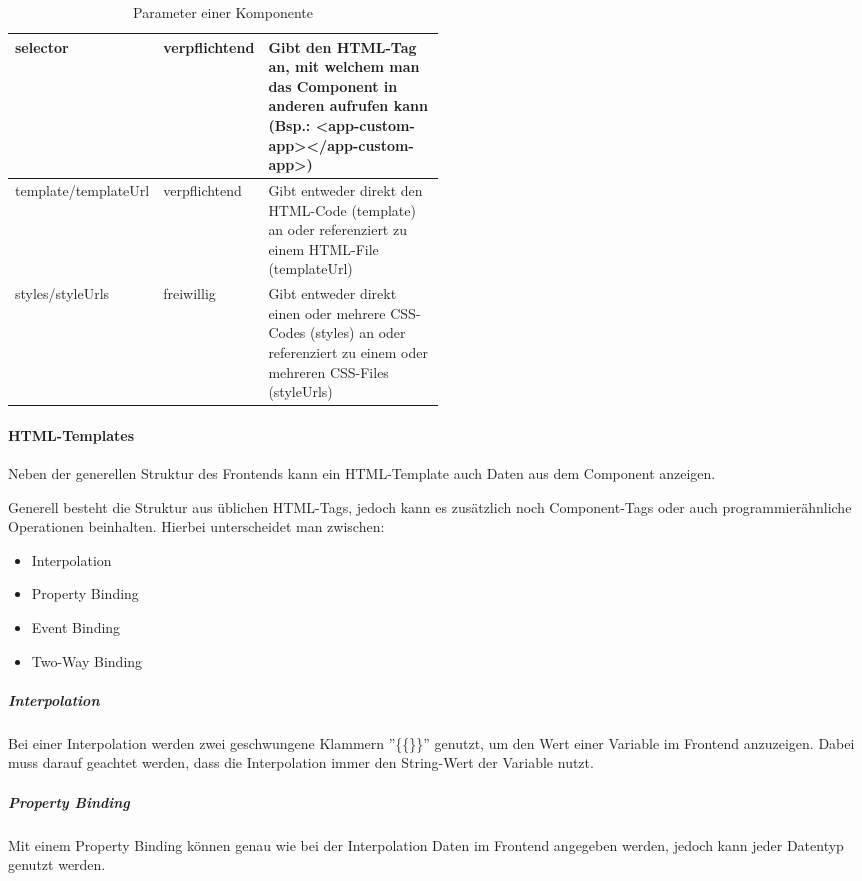 \begin{table}[H]
    \centering
    \begin{tabular}{|l|l|p{0.5\linewidth}|}
        \hline
        selector             & verpflichtend & Gibt den HTML-Tag an, mit welchem man das Component in anderen aufrufen kann (Bsp.: <app-custom-app></app-custom-app>)       \\ \hline
        template/templateUrl & verpflichtend & Gibt entweder direkt den HTML-Code (template) an oder referenziert zu einem HTML-File (templateUrl)                          \\ \hline
        styles/styleUrls     & freiwillig    & Gibt entweder direkt einen oder mehrere CSS-Codes (styles) an oder referenziert zu einem oder mehreren CSS-Files (styleUrls) \\ \hline
    \end{tabular}
    \caption{Parameter einer Komponente}
\end{table}

\paragraph{HTML-Templates}

Neben der generellen Struktur des Frontends kann ein HTML-Template auch Daten aus dem Component anzeigen.



Generell besteht die Struktur aus üblichen HTML-Tags, jedoch kann es zusätzlich noch Component-Tags oder auch programmierähnliche Operationen beinhalten. Hierbei unterscheidet man zwischen:

\begin{itemize}
    \item Interpolation
    \item Property Binding
    \item Event Binding
    \item Two-Way Binding
\end{itemize}

\subparagraph{Interpolation} Bei einer Interpolation werden zwei geschwungene Klammern ''\{\{\}\}'' genutzt, um den Wert einer Variable im Frontend anzuzeigen. Dabei muss darauf geachtet werden, dass die Interpolation immer den String-Wert der Variable nutzt. \cite{ANG-IN}

\subparagraph{Property Binding} Mit einem Property Binding können genau wie bei der Interpolation Daten im Frontend angegeben werden, jedoch kann jeder Datentyp genutzt werden.

